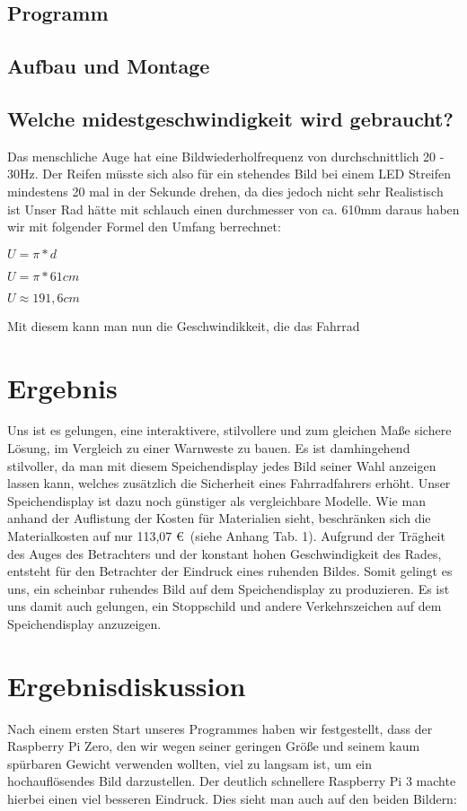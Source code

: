 \documentclass [a4paper, 11pt] {article}
\begin{document}
\subsection{Programm}
\subsection{Aufbau und Montage}
\subsection{Welche midestgeschwindigkeit wird gebraucht?}
Das menschliche Auge hat eine Bildwiederholfrequenz von durchschnittlich 20 - 30Hz. Der Reifen müsste sich also für ein stehendes Bild bei einem LED Streifen mindestens 20 mal in der Sekunde drehen, da dies jedoch nicht sehr Realistisch ist Unser Rad hätte mit schlauch einen durchmesser von ca. 610mm daraus haben wir mit folgender Formel den Umfang berrechnet:
\begin{center}

$ U = \pi * d $

$ U = \pi * 61cm$ 

$ U \approx 191,6cm$
\end{center}
Mit diesem kann man nun die Geschwindikkeit, die das Fahrrad 



\section{Ergebnis}
Uns ist es gelungen, eine interaktivere, stilvollere und zum gleichen Maße sichere Lösung, im Vergleich zu einer Warnweste zu bauen. Es ist damhingehend stilvoller, da man mit diesem Speichendisplay jedes Bild seiner Wahl anzeigen lassen kann, welches zusätzlich die Sicherheit eines Fahrradfahrers erhöht.
Unser Speichendisplay ist dazu noch günstiger als vergleichbare Modelle. Wie man anhand der Auflistung der Kosten für Materialien sieht, beschränken sich die Materialkosten auf nur 113,07 \euro\ (siehe Anhang Tab. 1). Aufgrund der Trägheit des Auges des Betrachters und der konstant hohen Geschwindigkeit des Rades, entsteht für den Betrachter der Eindruck eines ruhenden Bildes. Somit gelingt es uns, ein scheinbar ruhendes Bild auf dem Speichendisplay zu produzieren. Es ist uns damit auch gelungen, ein Stoppschild und andere Verkehrszeichen auf dem Speichendisplay anzuzeigen.
\section{Ergebnisdiskussion}
Nach einem ersten Start unseres Programmes haben wir festgestellt, dass der Raspberry Pi Zero, den wir wegen seiner geringen Größe und seinem kaum spürbaren Gewicht verwenden wollten, viel zu langsam ist, um ein hochauflösendes Bild darzustellen. Der deutlich schnellere Raspberry Pi 3 machte hierbei einen viel besseren Eindruck. Dies sieht man auch auf den beiden Bildern:
\end{document}
